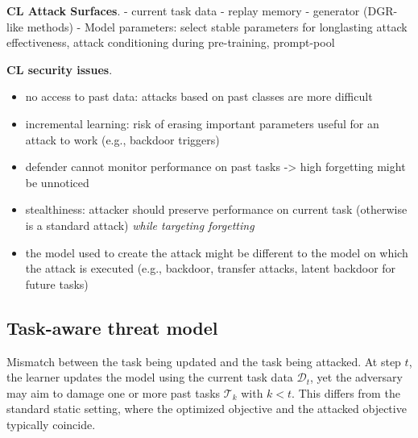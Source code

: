 \documentclass[5p,times]{elsarticle}
\newcommand{\myparagraph}[1]{\noindent \textbf{#1}.}
\begin{document}
\myparagraph{CL Attack Surfaces}
- current task data
- replay memory
- generator (DGR-like methods)
- Model parameters: select stable parameters for longlasting attack effectiveness, attack conditioning during pre-training, prompt-pool

\myparagraph{CL security issues}
\begin{itemize}
\item no access to past data: attacks based on past classes are more difficult
\item incremental learning: risk of erasing important parameters useful for an attack to work (e.g., backdoor triggers)
\item defender cannot monitor performance on past tasks -> high forgetting might be unnoticed
\item stealthiness: attacker should preserve performance on current task (otherwise is a standard attack) \textit{while targeting forgetting}
\item the model used to create the attack might be different to the model on which the attack is executed (e.g., backdoor, transfer attacks, latent backdoor for future tasks)
\end{itemize}





\subsection{Task-aware threat model}
Mismatch between the task being updated and the task being attacked. At step $t$, the learner updates the model using the current task data $\mathcal{D}_t$, yet the adversary may aim to damage one or more past tasks $\mathcal{T}_k$ with $k<t$. This differs from the standard static setting, where the optimized objective and the attacked objective typically coincide.
\end{document}

